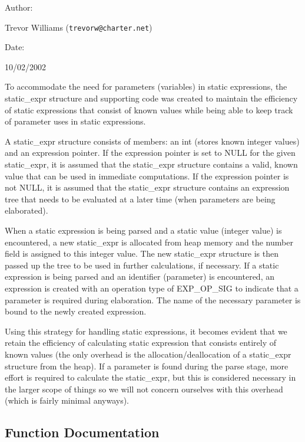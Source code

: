 \begin{Desc}
\item[Author: ]\par
Trevor Williams ({\tt trevorw@charter.net}) \end{Desc}
\begin{Desc}
\item[Date: ]\par
10/02/2002

 To accommodate the need for parameters (variables) in static expressions, the static\_\-expr structure and supporting code was created to maintain the efficiency of static expressions that consist of known values while being able to keep track of parameter uses in static expressions.

 A static\_\-expr structure consists of members: an int (stores known integer values) and an expression pointer. If the expression pointer is set to NULL for the given static\_\-expr, it is assumed that the static\_\-expr structure contains a valid, known value that can be used in immediate computations. If the expression pointer is not NULL, it is assumed that the static\_\-expr structure contains an expression tree that needs to be evaluated at a later time (when parameters are being elaborated).

 When a static expression is being parsed and a static value (integer value) is encountered, a new static\_\-expr is allocated from heap memory and the number field is assigned to this integer value. The new static\_\-expr structure is then passed up the tree to be used in further calculations, if necessary. If a static expression is being parsed and an identifier (parameter) is encountered, an expression is created with an operation type of EXP\_\-OP\_\-SIG to indicate that a parameter is required during elaboration. The name of the necessary parameter is bound to the newly created expression.

 Using this strategy for handling static expressions, it becomes evident that we retain the efficiency of calculating static expression that consists entirely of known values (the only overhead is the allocation/deallocation of a static\_\-expr structure from the heap). If a parameter is found during the parse stage, more effort is required to calculate the static\_\-expr, but this is considered necessary in the larger scope of things so we will not concern ourselves with this overhead (which is fairly minimal anyways).\end{Desc}


\subsection{Function Documentation}
